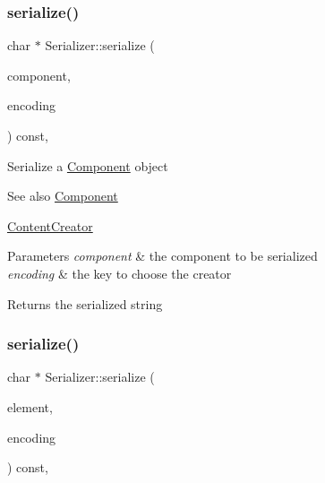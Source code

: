 \subsubsection{\texorpdfstring{serialize()}{serialize()}\hspace{0.1cm}{\footnotesize\ttfamily [1/2]}}
{\footnotesize\ttfamily char $\ast$ Serializer\+::serialize (\begin{DoxyParamCaption}\item[{const \mbox{\hyperlink{classComponent}{Component}} $\ast$}]{component,  }\item[{const char $\ast$}]{encoding }\end{DoxyParamCaption}) const\hspace{0.3cm}{\ttfamily [virtual]}, {\ttfamily [inherited]}}

Serialize a \mbox{\hyperlink{classComponent}{Component}} object \begin{DoxySeeAlso}{See also}
\mbox{\hyperlink{classComponent}{Component}} 

\mbox{\hyperlink{classContentCreator}{Content\+Creator}}
\end{DoxySeeAlso}

\begin{DoxyParams}{Parameters}
{\em component} & the component to be serialized \\
\hline
{\em encoding} & the key to choose the creator \\
\hline
\end{DoxyParams}
\begin{DoxyReturn}{Returns}
the serialized string 
\end{DoxyReturn}
\mbox{\label{classSerializer_a38bec517fb3b3cc0778c75b807cb930c}} 
\subsubsection{\texorpdfstring{serialize()}{serialize()}\hspace{0.1cm}{\footnotesize\ttfamily [2/2]}}
{\footnotesize\ttfamily char $\ast$ Serializer\+::serialize (\begin{DoxyParamCaption}\item[{\mbox{\hyperlink{classElement}{Element}} $\ast$}]{element,  }\item[{const char $\ast$}]{encoding }\end{DoxyParamCaption}) const\hspace{0.3cm}{\ttfamily [virtual]}, {\ttfamily [inherited]}}

